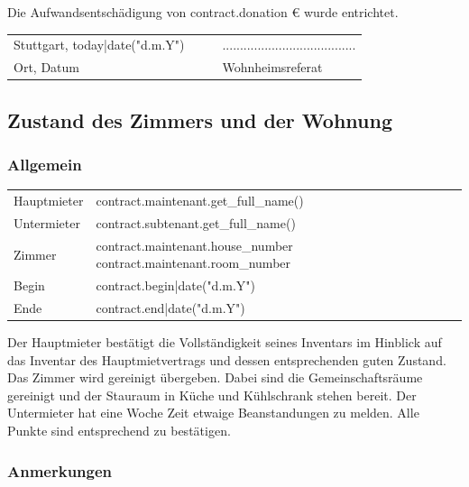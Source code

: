 \documentclass[9pt,pdftex,a4paper]{article}
\newcommand{\signLine}{......................................}
\begin{document}
{{Die Aufwandsentschädigung von {{ contract.donation }}€ wurde entrichtet.

\vfill

\begin{tabularx}{\textwidth}{@{}YYYY@{}}
Stuttgart, {{ today|date("d.m.Y") }} &  &  & \signLine\\
Ort, Datum &  &  & Wohnheimsreferat\\
\end{tabularx}

%
%

\newpage

\subsection*{Zustand des Zimmers und der Wohnung}

\subsubsection*{Allgemein}
\begin{tabularx}{\textwidth}{XX}
Hauptmieter & {{ contract.maintenant.get_full_name() }}\\
Untermieter &  {{ contract.subtenant.get_full_name() }}\\
Zimmer & {{ contract.maintenant.house_number }} {{ contract.maintenant.room_number }}\\
Begin & {{ contract.begin|date("d.m.Y") }}\\
Ende & {{ contract.end|date("d.m.Y") }}\\
\end{tabularx}\bigskip

Der Hauptmieter bestätigt die Vollständigkeit seines Inventars im Hinblick auf das Inventar des Hauptmietvertrags und dessen entsprechenden guten Zustand.
Das Zimmer wird gereinigt übergeben. Dabei sind die Gemeinschaftsräume gereinigt und der Stauraum in Küche und Kühlschrank stehen bereit.
Der Untermieter hat eine Woche Zeit etwaige Beanstandungen zu melden.
Alle Punkte sind entsprechend zu bestätigen.

{%
\subsubsection*{Anmerkungen}

}}}
\end{document}
